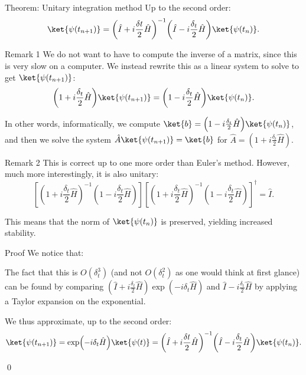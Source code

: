 \documentclass[a4paper]{article}
\begin{document}
\begin{parag}{Theorem: Unitary integration method}
    Up to the second order:
    \[\ket{\psi\left(t_{n+1}\right)} = \left(\hat{I} + i \frac{\delta t}{2} \hat{H}\right)^{-1} \left(\hat{I} - i \frac{\delta_t}{2} \hat{H}\right) \ket{\psi\left(t_n\right)}.\]

    \begin{subparag}{Remark 1}
        We do not want to have to compute the inverse of a matrix, since this is very slow on a computer. We instead rewrite this as a linear system to solve to get $\ket{\psi\left(t_{n+1}\right)}$:
        \[\left(1 + i\frac{\delta_t}{2} \hat{H}\right) \ket{\psi\left(t_{n+1}\right)} = \left(1 - i\frac{\delta_t}{2} \hat{H}\right) \ket{\psi\left(t_n\right)}.\]
        
        In other words, informatically, we compute $\ket{b} = \left(1 - i\frac{\delta_t}{2} \hat{H}\right) \ket{\psi\left(t_n\right)}$, and then we solve the system $\hat{A} \ket{\psi\left(t_{n+1}\right)} = \ket{b}$ for $\hat{A} = \left(1 + i\frac{\delta_t}{2} \hat{H}\right)$.
    \end{subparag}
    
    \begin{subparag}{Remark 2}
        This is correct up to one more order than Euler's method. However, much more interestingly, it is also unitary: 
        \[\left[\left(1 + i \frac{\delta_t}{2} \hat{H}\right)^{-1} \left(1 - i \frac{\delta_t}{2} \hat{H}\right)\right]\left[\left(1 + i \frac{\delta_t}{2} \hat{H}\right)^{-1} \left(1 - i \frac{\delta_t}{2} \hat{H}\right)\right]^{\dagger} = \hat{I}.\]
        
        This means that the norm of $\ket{\psi\left(t_n\right)}$ is preserved, yielding increased stability.
    \end{subparag}

    \begin{subparag}{Proof}
        We notice that: 

        The fact that this is $O\left(\delta_t^3\right)$ (and not $O\left(\delta_t^2\right)$ as one would think at first glance) can be found by comparing $\left(\hat{I} + i \frac{\delta_t}{2} \hat{H}\right)\exp\left(-i \delta_t \hat{H}\right)$ and $\hat{I} - i \frac{\delta_t}{2} \hat{H}$ by applying a Taylor expansion on the exponential.

        We thus approximate, up to the second order: 
        \[\ket{\psi\left(t_{n+1}\right)} = \exp\left(-i \delta_t \hat{H}\right) \ket{\psi\left(t\right)} = \left(\hat{I} + i \frac{\delta t}{2} \hat{H}\right)^{-1} \left(\hat{I} - i \frac{\delta_t}{2} \hat{H}\right) \ket{\psi\left(t_n\right)}.\]

        \qed
    \end{subparag}
\end{parag}
\end{document}
